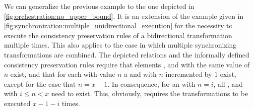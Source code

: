 We can generalize the previous example to the one depicted in \autoref{fig:orchestration:no_upper_bound}.
It is an extension of the example given in \autoref{fig:synchronization:multiple_unidirectional_execution} for the necessity to execute the consistency preservation rules of a bidirectional transformation multiple times.
This also applies to the case in which multiple synchronizing transformations are combined.
The depicted relations and the informally defined consistency preservation rules require that elements ,  and  with the same value of $n$ exist, and that for each  with value $n$ a  and  with $n$ incremented by $1$ exist, except for the case that $n = x-1$.
In consequence, for an  with $n = i$, all ,  and  with $i \leq n < x$ need to exist.
This, obviously, requires the transformations to be executed $x-1-i$ times.

